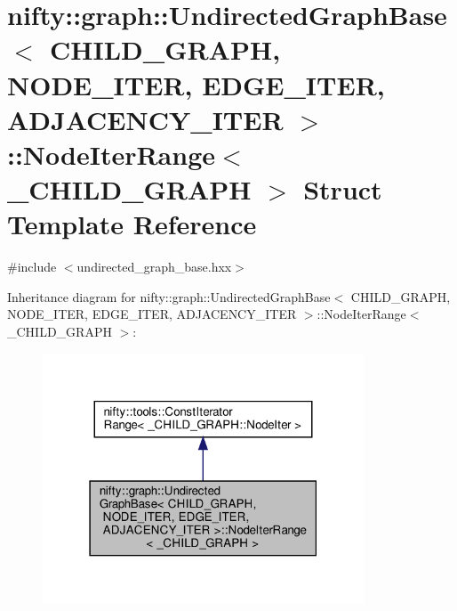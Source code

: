 \hypertarget{structnifty_1_1graph_1_1UndirectedGraphBase_1_1NodeIterRange}{}\section{nifty\+:\+:graph\+:\+:Undirected\+Graph\+Base$<$ C\+H\+I\+L\+D\+\_\+\+G\+R\+A\+PH, N\+O\+D\+E\+\_\+\+I\+T\+ER, E\+D\+G\+E\+\_\+\+I\+T\+ER, A\+D\+J\+A\+C\+E\+N\+C\+Y\+\_\+\+I\+T\+ER $>$\+:\+:Node\+Iter\+Range$<$ \+\_\+\+C\+H\+I\+L\+D\+\_\+\+G\+R\+A\+PH $>$ Struct Template Reference}
\label{structnifty_1_1graph_1_1UndirectedGraphBase_1_1NodeIterRange}


{\ttfamily \#include $<$undirected\+\_\+graph\+\_\+base.\+hxx$>$}



Inheritance diagram for nifty\+:\+:graph\+:\+:Undirected\+Graph\+Base$<$ C\+H\+I\+L\+D\+\_\+\+G\+R\+A\+PH, N\+O\+D\+E\+\_\+\+I\+T\+ER, E\+D\+G\+E\+\_\+\+I\+T\+ER, A\+D\+J\+A\+C\+E\+N\+C\+Y\+\_\+\+I\+T\+ER $>$\+:\+:Node\+Iter\+Range$<$ \+\_\+\+C\+H\+I\+L\+D\+\_\+\+G\+R\+A\+PH $>$\+:
\nopagebreak
\begin{figure}[H]
\begin{center}
\leavevmode
\includegraphics[width=271pt]{structnifty_1_1graph_1_1UndirectedGraphBase_1_1NodeIterRange__inherit__graph}
\end{center}
\end{figure}


